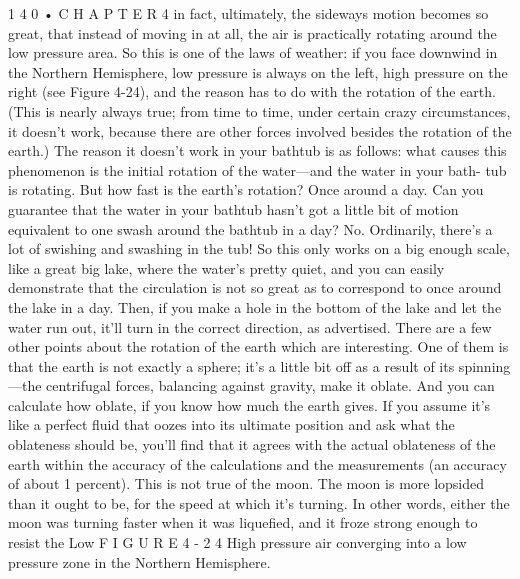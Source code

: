 \documentclass[10pt,oneside]{article}
\begin{document}
1 4 0 • C H A P T E R  4 in fact, ultimately, the sideways motion becomes so great, that instead of moving in at all, the air is practically rotating around the low pressure area. So this is one of the laws of weather: if you face downwind in the Northern Hemisphere, low pressure is always on the left, high pressure on the right (see Figure 4-24), and the reason has to do with the rotation of the earth. (This is nearly always true; from time to time, under certain crazy circumstances, it doesn’t work, because there are other forces involved besides the rotation of the earth.) The reason it doesn’t work in your bathtub is as follows: what causes this phenomenon is the initial rotation of the water---and the water in your bath- tub is rotating. But how fast is the earth’s rotation? Once around a day. Can you guarantee that the water in your bathtub hasn’t got a little bit of motion equivalent to one swash around the bathtub in a day? No. Ordinarily, there’s a lot of swishing and swashing in the tub! So this only works on a big enough scale, like a great big lake, where the water’s pretty quiet, and you can easily demonstrate that the circulation is not so great as to correspond to once around the lake in a day. Then, if you make a hole in the bottom of the lake and let the water run out, it’ll turn in the correct direction, as advertised. There are a few other points about the rotation of the earth which are interesting. One of them is that the earth is not exactly a sphere; it’s a little bit off as a result of its spinning---the centrifugal forces, balancing against gravity, make it oblate. And you can calculate how oblate, if you know how much the earth gives. If you assume it’s like a perfect fluid that oozes into its ultimate position and ask what the oblateness should be, you’ll find that it agrees with the actual oblateness of the earth within the accuracy of the calculations and the measurements (an accuracy of about 1 percent). This is not true of the moon. The moon is more lopsided than it ought to be, for the speed at which it’s turning. In other words, either the moon was turning faster when it was liquefied, and it froze strong enough to resist the Low F I G U R E  4 - 2 4 High pressure air converging into a low pressure zone in the Northern Hemisphere.\par
\end{document}
